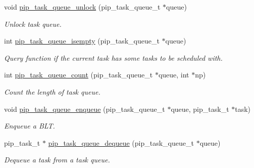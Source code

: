 \begin{DoxyCompactItemize}
\item 
void \hyperlink{group__libpip_gaf4cfe9905f1862718f65ba2fda961b84}{pip\-\_\-task\-\_\-queue\-\_\-unlock} (pip\-\_\-task\-\_\-queue\-\_\-t $\ast$queue)
\begin{DoxyCompactList}\small\item\em Unlock task queue. \end{DoxyCompactList}\end{DoxyCompactItemize}
\begin{DoxyCompactItemize}
\item 
int \hyperlink{group__libpip_gabf772cd5ea121458291801a26dea5c9d}{pip\-\_\-task\-\_\-queue\-\_\-isempty} (pip\-\_\-task\-\_\-queue\-\_\-t $\ast$queue)
\begin{DoxyCompactList}\small\item\em Query function if the current task has some tasks to be scheduled with. \end{DoxyCompactList}\end{DoxyCompactItemize}
\begin{DoxyCompactItemize}
\item 
int \hyperlink{group__libpip_ga5a043af776eb89933bfc0a057790cc82}{pip\-\_\-task\-\_\-queue\-\_\-count} (pip\-\_\-task\-\_\-queue\-\_\-t $\ast$queue, int $\ast$np)
\begin{DoxyCompactList}\small\item\em Count the length of task queue. \end{DoxyCompactList}\end{DoxyCompactItemize}
\begin{DoxyCompactItemize}
\item 
void \hyperlink{group__libpip_gae0f80336f51c43c3da988dd0467453cf}{pip\-\_\-task\-\_\-queue\-\_\-enqueue} (pip\-\_\-task\-\_\-queue\-\_\-t $\ast$queue, pip\-\_\-task\-\_\-t $\ast$task)
\begin{DoxyCompactList}\small\item\em Enqueue a B\-L\-T. \end{DoxyCompactList}\end{DoxyCompactItemize}
\begin{DoxyCompactItemize}
\item 
pip\-\_\-task\-\_\-t $\ast$ \hyperlink{group__libpip_ga943bace202c72533951df9fc43f62277}{pip\-\_\-task\-\_\-queue\-\_\-dequeue} (pip\-\_\-task\-\_\-queue\-\_\-t $\ast$queue)
\begin{DoxyCompactList}\small\item\em Dequeue a task from a task queue. \end{DoxyCompactList}\end{DoxyCompactItemize}

